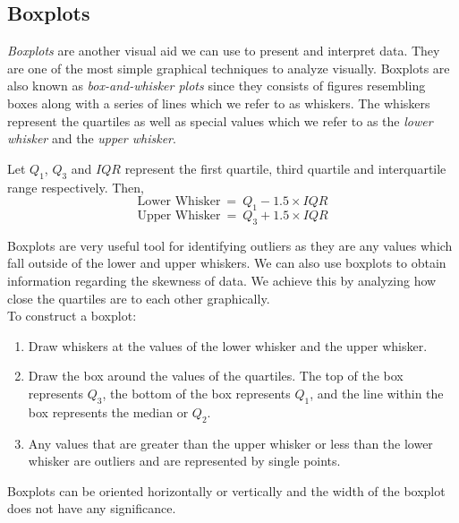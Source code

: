 \subsection{Boxplots}\label{sectionBoxplots}

\textit{Boxplots} are another visual aid we can use to present and interpret data.
They are one of the most simple graphical techniques to analyze visually.
Boxplots are also known as \textit{box-and-whisker plots} since they consists of
figures resembling boxes along with a series of lines which we refer to as whiskers.
The whiskers represent the quartiles as well as special values which we refer to as
the \textit{lower whisker} and the \textit{upper whisker}.

\begin{definition}
Let $Q_{1}$, $Q_{3}$ and $IQR$ represent the first quartile, third quartile and 
interquartile range respectively. Then,
\[ \text{Lower Whisker} ~ = ~ Q_{1} - 1.5 \times IQR \]
\[ \text{Upper Whisker} ~ = ~ Q_{3} + 1.5 \times IQR \]
\end{definition}

\noindent
Boxplots are very useful tool for identifying outliers as they are any values which fall outside of the lower and upper whiskers. We can also use boxplots to obtain information regarding the skewness of data. We achieve this by analyzing how close the quartiles are to each other graphically.\\

\noindent
To construct a boxplot:
\begin{enumerate}
\item Draw whiskers at the values
of the lower whisker and the upper whisker.
\item Draw the box around the values of the quartiles. The top of the box represents $Q_3$, the bottom of the box represents $Q_1$, and the line within the box represents the median or $Q_2$.
\item Any values that are greater than the upper whisker or less than the lower whisker are outliers and are represented by single points.
\end{enumerate}

\begin{nt}
Boxplots can be oriented horizontally or vertically and the width of the boxplot does not have any significance.
\end{nt}

